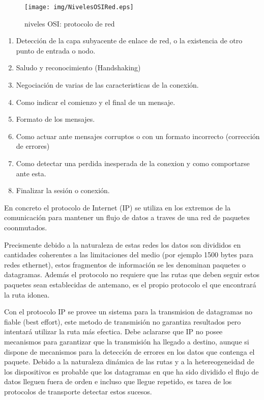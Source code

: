 \documentclass[a4paper,spanish,12pt]{book}
\begin{document}
\begin{figure}
	\texttt{[image: img/NivelesOSIRed.eps]}	
              \caption{niveles OSI: protocolo de red}
  \label{fig:nivelesOSIRed}
\end{figure}


\begin{enumerate}
\item Detección de la capa subyacente de enlace de red, o la existencia de otro punto de entrada o nodo.
\item Saludo y reconocimiento (Handshaking)
\item Negociación de varias de las caracteristicas de la conexión.
\item Como indicar el comienzo y el final de un mensaje.
\item Formato de los mensajes.
\item Como actuar ante mensajes corruptos o con un formato incorrecto (corrección de errores)
\item Como detectar una perdida inesperada de la conexion y como comportarse ante esta.
\item Finalizar la sesión o conexión.
\end{enumerate}

En concreto el protocolo de Internet (IP) se utiliza en los extremos de la comunicación para mantener un flujo de datos a traves de una red de paquetes coonmutados.

Precismente debido a la naturaleza de estas redes los datos son divididos en cantidades coherentes a las limitaciones del medio (por ejemplo 1500 bytes para redes ethernet), estos fragmentos de información se les denominan paquetes o datagramas. Además el protocolo no requiere que las rutas que deben seguir estos paquetes sean establecidas de antemano, es el propio protocolo el que encontrará la ruta idonea.

Con el protocolo IP se provee un sistema para la transmision de datagramas no fiable (best effort), este metodo de transmisión no garantiza resultados pero intentará utilizar la ruta más efectica. Debe aclararse que IP no posee mecanismos para garantizar que la transmisión ha llegado a destino, aunque si dispone de mecanismos para la detección de errores en los datos que contenga el paquete. Debido a la naturaleza dinámica de las rutas y a la hetereogeneidad de los dispositivos es probable que los datagramas en que ha sido dividido el flujo de datos lleguen fuera de orden e incluso que llegue repetido, es tarea de los protocolos de transporte detectar estos sucesos.
\end{document}

